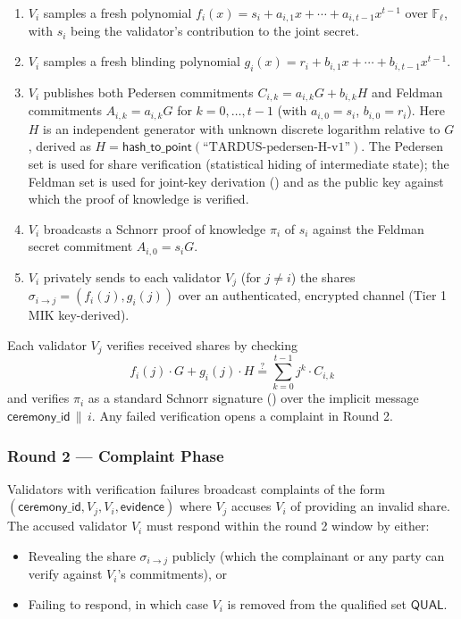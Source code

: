 \begin{enumerate}[leftmargin=2em,itemsep=0.2em]
  \item $V_i$ samples a fresh polynomial $f_i(x) = s_i + a_{i,1} x + \cdots + a_{i,t-1} x^{t-1}$ over $\mathbb{F}_\ell$, with $s_i$ being the validator's contribution to the joint secret.
  \item $V_i$ samples a fresh blinding polynomial $g_i(x) = r_i + b_{i,1} x + \cdots + b_{i,t-1} x^{t-1}$.
  \item $V_i$ publishes both Pedersen commitments $C_{i,k} = a_{i,k} G + b_{i,k} H$ and Feldman commitments $A_{i,k} = a_{i,k} G$ for $k = 0, \ldots, t-1$ (with $a_{i,0} = s_i$, $b_{i,0} = r_i$). Here $H$ is an independent generator with unknown discrete logarithm relative to $G$, derived as $H = \mathsf{hash\_to\_point}(\text{``TARDUS-pedersen-H-v1''})$. The Pedersen set is used for share verification (statistical hiding of intermediate state); the Feldman set is used for joint-key derivation () and as the public key against which the proof of knowledge is verified.
  \item $V_i$ broadcasts a Schnorr proof of knowledge $\pi_i$ of $s_i$ against the Feldman secret commitment $A_{i,0} = s_i G$.
  \item $V_i$ privately sends to each validator $V_j$ (for $j \neq i$) the shares $\sigma_{i \to j} = (f_i(j), g_i(j))$ over an authenticated, encrypted channel (Tier 1 MIK key-derived).
\end{enumerate}

Each validator $V_j$ verifies received shares by checking
\[
  f_i(j) \cdot G + g_i(j) \cdot H \stackrel{?}{=} \sum_{k=0}^{t-1} j^k \cdot C_{i,k}
\]
and verifies $\pi_i$ as a standard Schnorr signature () over the implicit message $\mathsf{ceremony\_id} \,\|\, i$. Any failed verification opens a complaint in Round 2.

\subsubsection{Round 2 --- Complaint Phase}
\label{sec:mint-dkg-r2}

Validators with verification failures broadcast complaints of the form $(\mathsf{ceremony\_id}, V_j, V_i, \mathsf{evidence})$ where $V_j$ accuses $V_i$ of providing an invalid share. The accused validator $V_i$ must respond within the round 2 window by either:

\begin{itemize}[leftmargin=2em,itemsep=0pt]
  \item Revealing the share $\sigma_{i \to j}$ publicly (which the complainant or any party can verify against $V_i$'s commitments), or
  \item Failing to respond, in which case $V_i$ is removed from the qualified set $\mathsf{QUAL}$.
\end{itemize}

